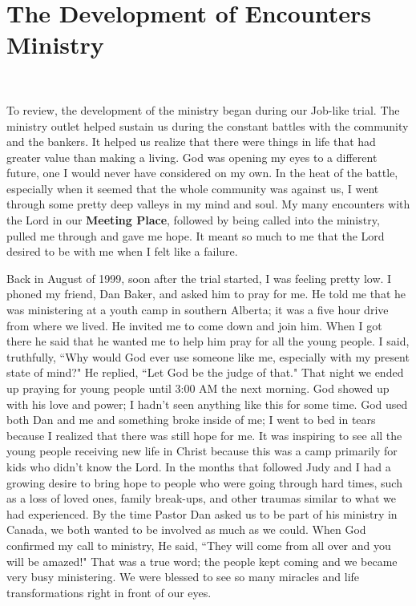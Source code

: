 \documentclass[oneside]{book}
\begin{document}
\chapter{The Development of Encounters Ministry}
\

To review, the development of the ministry began during our Job-like trial. The ministry outlet helped sustain us during the constant battles with the community and the bankers. It helped us realize that there were things in life that had greater value than making a living. God was opening my eyes to a different future, one I would never have considered on my own. In the heat of the battle, especially when it seemed that the whole community was against us, I went through some pretty deep valleys in my mind and soul. My many encounters with the Lord in our \textbf{Meeting Place}, followed by being called into the ministry, pulled me through and gave me hope. It meant so much to me that the Lord desired to be with me when I felt like a failure. 

Back in August of 1999, soon after the trial started, I was feeling pretty low. I phoned my friend, Dan Baker, and asked him to pray for me. He told me that he was ministering at a youth camp in southern Alberta; it was a five hour drive from where we lived. He invited me to come down and join him. When I got there he said that he wanted me to help him pray for all the young people. I said, truthfully, ``Why would God ever use someone like me, especially with my present state of mind?" He replied, ``Let God be the judge of that." That night we ended up praying for young people until 3:00 AM the next morning. God showed up with his love and power; I hadn't seen anything like this for some time. God used both Dan and me and something broke inside of me; I went to bed in tears because I realized that there was still hope for me. It was inspiring to see all the young people receiving new life in Christ because this was a camp primarily for kids who didn't know the Lord. In the months that followed Judy and I had a growing desire to bring hope to people who were going through hard times, such as a loss of loved ones, family break-ups, and other traumas similar to what we had experienced. By the time Pastor Dan asked us to be part of his ministry in Canada, we both wanted to be involved as much as we could. When God confirmed my call to ministry, He said, ``They will come from all over and you will be amazed!" That was a true word; the people kept coming and we became very busy ministering. We were blessed to see so many miracles and life transformations right in front of our eyes. 
\end{document}
